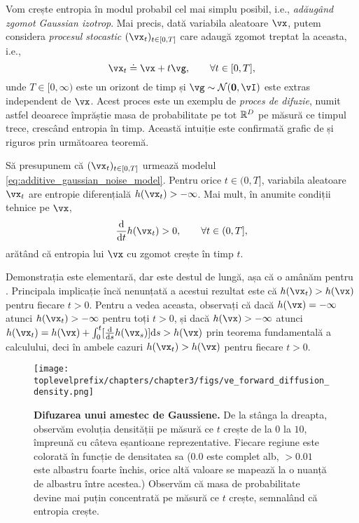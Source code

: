 \documentclass[../../book-main_ro.tex]{subfiles}
\begin{document}
Vom crește entropia în modul probabil cel mai simplu posibil, i.e., \textit{adăugând zgomot Gaussian izotrop}. Mai precis, dată variabila aleatoare \(\vx\), putem considera \textit{procesul stocastic} \((\vx_{t})_{t \in [0, T]}\) care adaugă zgomot treptat la aceasta, i.e.,
\begin{equation}\label{eq:additive_gaussian_noise_model}
	\vx_{t} \doteq \vx + t\vg, \qquad \forall t \in [0, T],
\end{equation}
unde \(T \in [0, \infty)\) este un orizont de timp și \(\vg \sim \dNorm(\vzero, \vI)\) este extras independent de \(\vx\). Acest proces este un exemplu de \textit{proces de difuzie}, numit astfel deoarece împrăștie masa de probabilitate pe tot \(\mathbb{R}^{D}\) pe măsură ce timpul trece, crescând entropia în timp. Această intuiție este confirmată grafic de  și riguros prin următoarea teoremă.
\begin{theorem}
	Să presupunem că \((\vx_{t})_{t \in [0, T]}\) urmează modelul \eqref{eq:additive_gaussian_noise_model}. Pentru orice \(t \in (0, T]\), variabila aleatoare \(\vx_{t}\) are entropie diferențială \(h(\vx_{t}) > -\infty\). Mai mult, în anumite condiții tehnice pe \(\vx\), 
	\begin{equation}
		\odv*{h(\vx_{t})}{t} > 0, \qquad \forall t \in (0, T],
	\end{equation}
	arătând că entropia lui \(\vx\) cu zgomot crește în timp \(t\).
\end{theorem}
Demonstrația este elementară, dar este destul de lungă, așa că o amânăm pentru . Principala implicație încă nenunțată a acestui rezultat este că \(h(\vx_{t}) > h(\vx)\) pentru fiecare \(t > 0\). Pentru a vedea aceasta, observați că dacă \(h(\vx) = -\infty\) atunci \(h(\vx_{t}) > -\infty\) pentru toți \(t > 0\), și dacă \(h(\vx) > -\infty\) atunci \(h(\vx_{t}) = h(\vx) + \int_{0}^{t}[\odv*{h(\vx_{s})}{s}]\odif{s} > h(\vx)\) prin teorema fundamentală a calculului, deci în ambele cazuri \(h(\vx_{t}) > h(\vx)\) pentru fiecare \(t > 0\).

\begin{figure}
	\texttt{[image: \\toplevelprefix/chapters/chapter3/figs/ve\_forward\_diffusion\_density.png]}
	\caption{\small\textbf{Difuzarea unui amestec de Gaussiene.} De la stânga la dreapta, observăm evoluția densității pe măsură ce \(t\) crește de la \(0\) la \(10\), împreună cu câteva eșantioane reprezentative. Fiecare regiune este colorată în funcție de densitatea sa (\(0.0\) este complet alb, \(> 0.01\) este albastru foarte închis, orice altă valoare se mapează la o nuanță de albastru între acestea.) Observăm că masa de probabilitate devine mai puțin concentrată pe măsură ce \(t\) crește, semnalând că entropia crește.}
	\label{fig:ve_forward_density}
\end{figure}
\end{document}
